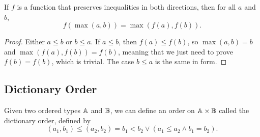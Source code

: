 \documentclass[../../math.tex]{subfiles}
\begin{document}
\begin{theorem} \label{homo-max}
    If $f$ is a function that preserves inequalities in both directions, then
    for all $a$ and $b$,
    \[
        f(\max(a, b)) = \max(f(a), f(b)).
    \]
\end{theorem}
\begin{proof}
    Either $a \leq b$ or $b \leq a$.  If $a \leq b$, then $f(a) \leq f(b)$, so
    $\max(a, b) = b$ and $\max(f(a), f(b)) = f(b)$, meaning that we just need to
    prove $f(b) = f(b)$, which is trivial.  The case $b \leq a$ is the same in
    form.
\end{proof}

\subsection{Dictionary Order}

\begin{definition}
    Given two ordered types $\mathbb{A}$ and $\mathbb{B}$, we can define an order on $\mathbb{A} \times
    \mathbb{B}$ called the dictionary order, defined by
    \[
        (a_1, b_1) \leq (a_2, b_2) = b_1 < b_2 \vee (a_1 \leq a_2 \wedge b_1 =
        b_2).
    \]
\end{definition}
\end{document}

